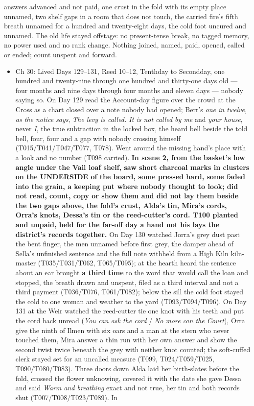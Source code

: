 \documentclass{design/chronicle}
\begin{document}
{\begin{itemize}[leftmargin=1.4em,itemsep=1pt,topsep=3pt,parsep=0pt]
answers advanced and not paid, one crust in the fold with its empty place unnamed, two shelf gaps in a room that does not touch, the carried fire’s fifth breath unnamed for a hundred and twenty-eight days, the cold foot uncured and unnamed. The old life stayed offstage: no present-tense break, no tagged memory, no power used and no rank change. Nothing joined, named, paid, opened, called or ended; count unspent and forward.

\end{itemize}

\begin{itemize}[leftmargin=1.4em,itemsep=1pt,topsep=3pt,parsep=0pt]

\item Ch 30: Lived Days 129–131, Reed 10–12, Tenthday to Secondday, one hundred and twenty-nine through one hundred and thirty-one days old — four months and nine days through four months and eleven days — nobody saying so. On Day 129 read the Account-day figure over the crowd at the Cross as a chart closed over a note nobody had opened; Berr’s \emph{one in twelve, as the notice says}, \emph{The levy is called. It is not called by me} and \emph{your house}, never \emph{I}, the true subtraction in the locked box, the heard bell beside the told bell, four, four and a gap with nobody crossing himself (T015/T041/T047/T077, T078). Went around the missing hand’s place with a look and no number (T098 carried). \textbf{In scene 2, from the basket’s low angle under the Vail loaf shelf, saw short charcoal marks in clusters on the UNDERSIDE of the board, some pressed hard, some faded into the grain, a keeping put where nobody thought to look; did not read, count, copy or show them and did not lay them beside the two gaps above, the fold’s crust, Alda’s tin, Mira’s cords, Orra’s knots, Dessa’s tin or the reed-cutter’s cord. T100 planted and unpaid, held for the far-off day a hand not his lays the district’s records together.} On Day 130 watched Jorra’s grey dust past the bent finger, the men unnamed before first grey, the damper ahead of Sella’s unfinished sentence and the full note withheld from a High Kiln kiln-master (T035/T031/T062, T065/T095); at the hearth heard the sentence about an ear brought \textbf{a third time} to the word that would call the loan and stopped, the breath drawn and unspent, filed as a third interval and not a third payment (T036/T076, T061/T082); below the sill the cold foot stayed the cold to one woman and weather to the yard (T093/T094/T096). On Day 131 at the Weir watched the reed-cutter tie one knot with his teeth and put the cord back unread (\emph{You can ask the cord} / \emph{No more can the Court}), Orra give the ninth of Ilmen with six oars and a man at the stern who never touched them, Mira answer a thin run with her own answer and show the second twist twice beneath the grey with neither knot counted; the soft-cuffed clerk stayed set for an uncalled measure (T099, T024/T059/T025, T090/T080/T083). Three doors down Alda laid her birth-slates before the fold, crossed the flower unknowing, covered it with the date she gave Dessa and said \emph{Warm and breathing} exact and not true, her tin and both records shut (T007/T008/T023/T089). In 
\end{itemize}}
\end{document}
